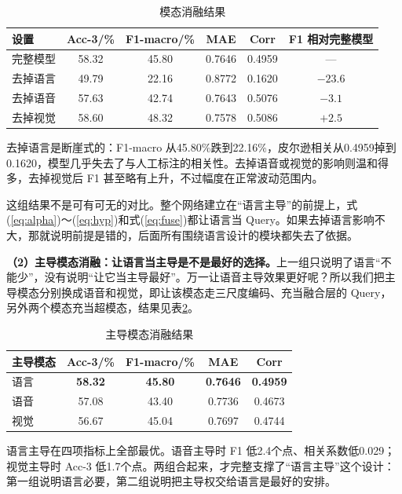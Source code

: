 \begin{table}[htbp]
\centering
\caption{模态消融结果}
\label{tab:abl_mod}
\begin{tabular}{lccccc}
\toprule
设置 & Acc-3/\% & F1-macro/\% & MAE & Corr & F1 相对完整模型 \\
\midrule
完整模型 & 58.32 & 45.80 & 0.7646 & 0.4959 & — \\
去掉语言 & 49.79 & 22.16 & 0.8772 & 0.1620 & $-23.6$ \\
去掉语音 & 57.63 & 42.74 & 0.7643 & 0.5076 & $-3.1$ \\
去掉视觉 & 58.60 & 48.32 & 0.7578 & 0.5086 & $+2.5$ \\
\bottomrule
\end{tabular}
\end{table}

去掉语言是断崖式的：F1-macro 从45.80\%跌到22.16\%，皮尔逊相关从0.4959掉到0.1620，模型几乎失去了与人工标注的相关性。去掉语音或视觉的影响则温和得多，去掉视觉后 F1 甚至略有上升，不过幅度在正常波动范围内。

这组结果不是可有可无的对比。整个网络建立在“语言主导”的前提上，式(\ref{eq:alpha})～(\ref{eq:hyp})和式(\ref{eq:fuse})都让语言当 Query。如果去掉语言影响不大，那就说明前提是错的，后面所有围绕语言设计的模块都失去了依据。

\textbf{（2）主导模态消融：让语言当主导是不是最好的选择。}上一组只说明了语言“不能少”，没有说明“让它当主导最好”。万一让语音主导效果更好呢？所以我们把主导模态分别换成语音和视觉，即让该模态走三尺度编码、充当融合层的 Query，另外两个模态充当超模态，结果见表\ref{tab:abl_dom}。

\begin{table}[htbp]
\centering
\caption{主导模态消融结果}
\label{tab:abl_dom}
\begin{tabular}{lcccc}
\toprule
主导模态 & Acc-3/\% & F1-macro/\% & MAE & Corr \\
\midrule
语言 & \textbf{58.32} & \textbf{45.80} & \textbf{0.7646} & \textbf{0.4959} \\
语音 & 57.08 & 43.40 & 0.7736 & 0.4673 \\
视觉 & 56.67 & 45.04 & 0.7697 & 0.4744 \\
\bottomrule
\end{tabular}
\end{table}

语言主导在四项指标上全部最优。语音主导时 F1 低2.4个点、相关系数低0.029；视觉主导时 Acc-3 低1.7个点。两组合起来，才完整支撑了“语言主导”这个设计：第一组说明语言必要，第二组说明把主导权交给语言是最好的安排。

